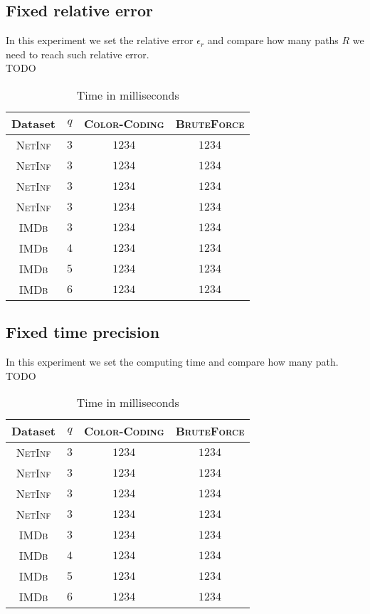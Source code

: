 	\subsection*{Fixed relative error}
	
	In this experiment we set the relative error $\epsilon_{r}$ and compare how many paths $R$ we need to reach such relative error.\\
	
	TODO
	\begin{table}[h]
		\centering
		\label{my-label}
		\begin{tabular}{|c|c|c|c|}
			\hline
			Dataset 		& $q$ & \textsc{Color-Coding} 	& \textsc{BruteForce} \\ \hline
			\textsc{NetInf}	& $3$ & $1234$					& $1234$ \\ \hline
			\textsc{NetInf}	& $3$ & $1234$					& $1234$ \\ \hline
			\textsc{NetInf}	& $3$ & $1234$					& $1234$ \\ \hline
			\textsc{NetInf}	& $3$ & $1234$					& $1234$ \\ \hline
			\textsc{IMDb}	& $3$ & $1234$					& $1234$ \\ \hline
			\textsc{IMDb}	& $4$ & $1234$					& $1234$ \\ \hline
			\textsc{IMDb}	& $5$ & $1234$					& $1234$ \\ \hline
			\textsc{IMDb}	& $6$ & $1234$					& $1234$ \\ \hline
		\end{tabular}
		\caption{Time in milliseconds}
	\end{table}
	
	\subsection*{Fixed time precision}
	
	In this experiment we set the computing time and compare how many path.\\
	
	TODO
	\begin{table}[h]
		\centering
		\label{my-label}
		\begin{tabular}{|c|c|c|c|}
			\hline
			Dataset 		& $q$ & \textsc{Color-Coding} 	& \textsc{BruteForce} \\ \hline
			\textsc{NetInf}	& $3$ & $1234$					& $1234$ \\ \hline
			\textsc{NetInf}	& $3$ & $1234$					& $1234$ \\ \hline
			\textsc{NetInf}	& $3$ & $1234$					& $1234$ \\ \hline
			\textsc{NetInf}	& $3$ & $1234$					& $1234$ \\ \hline
			\textsc{IMDb}	& $3$ & $1234$					& $1234$ \\ \hline
			\textsc{IMDb}	& $4$ & $1234$					& $1234$ \\ \hline
			\textsc{IMDb}	& $5$ & $1234$					& $1234$ \\ \hline
			\textsc{IMDb}	& $6$ & $1234$					& $1234$ \\ \hline
		\end{tabular}
		\caption{Time in milliseconds}
	\end{table}

